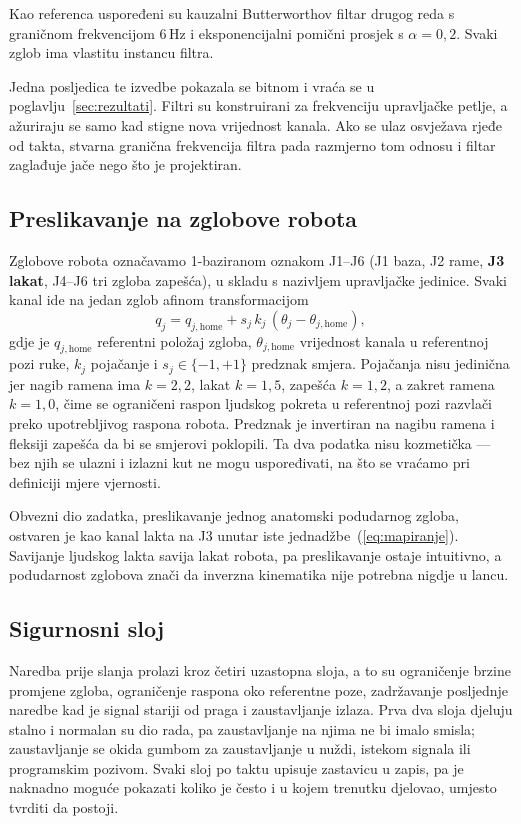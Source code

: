 Kao referenca uspoređeni su kauzalni Butterworthov filtar drugog reda s graničnom frekvencijom 6\,Hz i eksponencijalni pomični prosjek s $\alpha=0{,}2$. Svaki zglob ima vlastitu instancu filtra.

Jedna posljedica te izvedbe pokazala se bitnom i vraća se u
poglavlju~\ref{sec:rezultati}. Filtri su konstruirani za frekvenciju upravljačke
petlje, a ažuriraju se samo kad stigne nova vrijednost kanala. Ako se ulaz
osvježava rjeđe od takta, stvarna granična frekvencija filtra pada razmjerno tom
odnosu i filtar zaglađuje jače nego što je projektiran.

\subsection{Preslikavanje na zglobove robota}

Zglobove robota označavamo 1-baziranom oznakom J1--J6 (J1 baza, J2 rame,
\textbf{J3 lakat}, J4--J6 tri zgloba zapešća), u skladu s nazivljem upravljačke
jedinice. Svaki kanal ide na jedan zglob afinom transformacijom
\begin{equation}
  q_j = q_{j,\mathrm{home}} + s_j\,k_j\,(\theta_j - \theta_{j,\mathrm{home}}),
  \label{eq:mapiranje}
\end{equation}
gdje je $q_{j,\mathrm{home}}$ referentni položaj zgloba, $\theta_{j,\mathrm{home}}$
vrijednost kanala u referentnoj pozi ruke, $k_j$ pojačanje i
$s_j\in\{-1,+1\}$ predznak smjera. Pojačanja nisu jedinična jer nagib ramena ima
$k=2{,}2$, lakat $k=1{,}5$, zapešća $k=1{,}2$, a zakret ramena $k=1{,}0$, čime
se ograničeni raspon ljudskog pokreta u referentnoj pozi razvlači preko
upotrebljivog raspona robota. Predznak je invertiran na nagibu ramena i fleksiji
zapešća da bi se smjerovi poklopili. Ta dva podatka nisu kozmetička --- bez njih
se ulazni i izlazni kut ne mogu uspoređivati, na što se vraćamo pri definiciji
mjere vjernosti.

Obvezni dio zadatka, preslikavanje jednog anatomski podudarnog zgloba, ostvaren
je kao kanal lakta na J3 unutar iste jednadžbe~(\ref{eq:mapiranje}). Savijanje
ljudskog lakta savija lakat robota, pa preslikavanje ostaje intuitivno, a
podudarnost zglobova znači da inverzna kinematika nije potrebna nigdje u lancu.

\subsection{Sigurnosni sloj}

Naredba prije slanja prolazi kroz četiri uzastopna sloja, a to su ograničenje brzine
promjene zgloba, ograničenje raspona oko referentne poze, zadržavanje posljednje
naredbe kad je signal stariji od praga i zaustavljanje izlaza. Prva dva sloja
djeluju stalno i normalan su dio rada, pa zaustavljanje na njima ne bi imalo
smisla; zaustavljanje se okida gumbom za zaustavljanje u nuždi, istekom signala
ili programskim pozivom. Svaki sloj po taktu upisuje zastavicu u zapis, pa je
naknadno moguće pokazati koliko je često i u kojem trenutku djelovao, umjesto
tvrditi da postoji.

